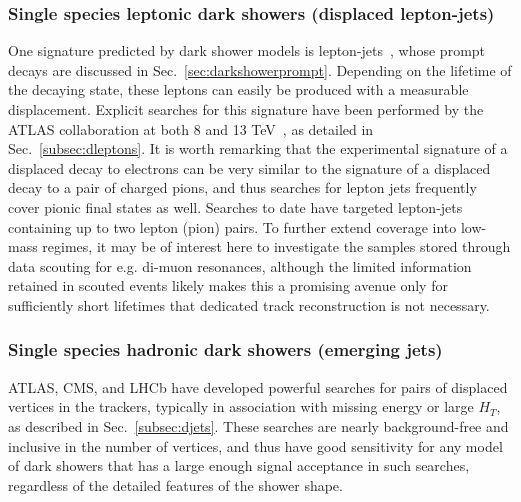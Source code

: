 \subsubsection{Single species leptonic dark showers (displaced lepton-jets)}
\label{sec:leptonjetsoffline}
One signature predicted by dark shower models is lepton-jets~\cite{Falkowski:2010cm,Falkowski:2010gv}, whose prompt decays are discussed in Sec.~\ref{sec:darkshowerprompt}. Depending on the lifetime of the decaying state, these leptons can easily be produced with a measurable displacement. Explicit searches for this signature  have been performed by the ATLAS collaboration at both 8 and 13 TeV~\cite{Aad:2014yea, ATLAS:2016jza}, as detailed in Sec.~\ref{subsec:dleptons}. It is worth remarking that the experimental signature of a displaced decay to electrons can be very similar to the signature of a displaced decay to a pair of charged pions, and thus searches for lepton jets frequently cover pionic final states as well.  Searches to date have targeted lepton-jets containing up to two lepton (pion) pairs.
To further extend coverage into low-mass regimes, it may be of interest here to investigate the samples stored through data scouting for e.g. di-muon resonances, although the limited information retained in scouted events likely makes this a promising avenue only for sufficiently short lifetimes that dedicated track reconstruction is not necessary.


\subsubsection{Single species hadronic dark showers (emerging jets)}
\label{sec:darkshoweremergingjets}


ATLAS, CMS, and LHCb have developed powerful searches for pairs of displaced vertices in the trackers, typically in association with missing energy or large $H_T$, as described in Sec.~\ref{subsec:djets}. These searches are nearly background-free and inclusive in the number of vertices, and thus have good sensitivity for any model of dark showers that has a large enough signal acceptance in such searches, regardless of the detailed features of the shower shape.

